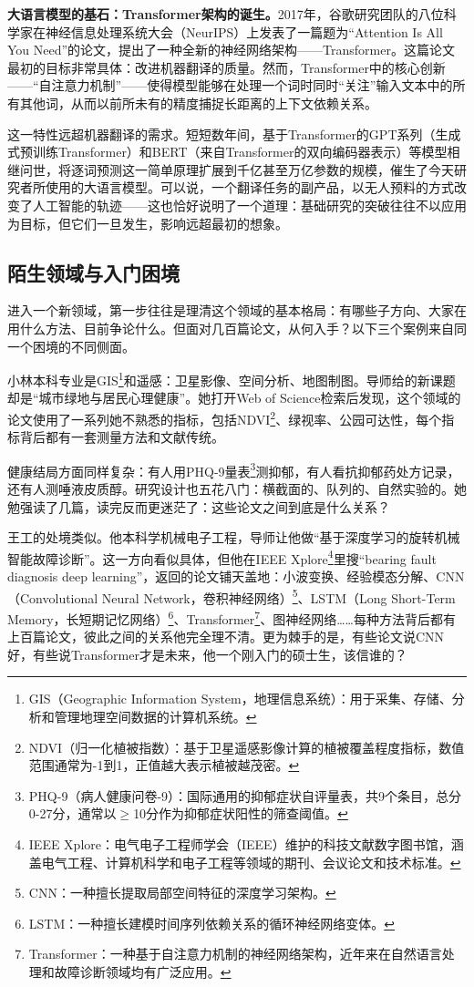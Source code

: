 \begin{funbox}
\textbf{大语言模型的基石：Transformer架构的诞生。}2017年，谷歌研究团队的八位科学家在神经信息处理系统大会（NeurIPS）上发表了一篇题为``Attention Is All You Need''的论文，提出了一种全新的神经网络架构——Transformer。这篇论文最初的目标非常具体：改进机器翻译的质量。然而，Transformer中的核心创新——``自注意力机制''——使得模型能够在处理一个词时同时``关注''输入文本中的所有其他词，从而以前所未有的精度捕捉长距离的上下文依赖关系。

这一特性远超机器翻译的需求。短短数年间，基于Transformer的GPT系列（生成式预训练Transformer）和BERT（来自Transformer的双向编码器表示）等模型相继问世，将逐词预测这一简单原理扩展到千亿甚至万亿参数的规模，催生了今天研究者所使用的大语言模型。可以说，一个翻译任务的副产品，以无人预料的方式改变了人工智能的轨迹——这也恰好说明了一个道理：基础研究的突破往往不以应用为目标，但它们一旦发生，影响远超最初的想象。
\end{funbox}

\subsection{陌生领域与入门困境}

进入一个新领域，第一步往往是理清这个领域的基本格局：有哪些子方向、大家在用什么方法、目前争论什么。但面对几百篇论文，从何入手？以下三个案例来自同一个困境的不同侧面。

小林本科专业是GIS\footnote{GIS（Geographic Information System，地理信息系统）：用于采集、存储、分析和管理地理空间数据的计算机系统。}和遥感：卫星影像、空间分析、地图制图。导师给的新课题却是``城市绿地与居民心理健康''。她打开Web of Science检索后发现，这个领域的论文使用了一系列她不熟悉的指标，包括NDVI\footnote{NDVI（归一化植被指数）：基于卫星遥感影像计算的植被覆盖程度指标，数值范围通常为-1到1，正值越大表示植被越茂密。}、绿视率、公园可达性，每个指标背后都有一套测量方法和文献传统。

健康结局方面同样复杂：有人用PHQ-9量表\footnote{PHQ-9（病人健康问卷-9）：国际通用的抑郁症状自评量表，共9个条目，总分0-27分，通常以$\geq$10分作为抑郁症状阳性的筛查阈值。}测抑郁，有人看抗抑郁药处方记录，还有人测唾液皮质醇。研究设计也五花八门：横截面的、队列的、自然实验的。她勉强读了几篇，读完反而更迷茫了：这些论文之间到底是什么关系？

王工的处境类似。他本科学机械电子工程，导师让他做``基于深度学习的旋转机械智能故障诊断''。这一方向看似具体，但他在IEEE Xplore\footnote{IEEE Xplore：电气电子工程师学会（IEEE）维护的科技文献数字图书馆，涵盖电气工程、计算机科学和电子工程等领域的期刊、会议论文和技术标准。}里搜``bearing fault diagnosis deep learning''，返回的论文铺天盖地：小波变换、经验模态分解、CNN（Convolutional Neural Network，卷积神经网络）\footnote{CNN：一种擅长提取局部空间特征的深度学习架构。}、LSTM（Long Short-Term Memory，长短期记忆网络）\footnote{LSTM：一种擅长建模时间序列依赖关系的循环神经网络变体。}、Transformer\footnote{Transformer：一种基于自注意力机制的神经网络架构，近年来在自然语言处理和故障诊断领域均有广泛应用。}、图神经网络……每种方法背后都有上百篇论文，彼此之间的关系他完全理不清。更为棘手的是，有些论文说CNN好，有些说Transformer才是未来，他一个刚入门的硕士生，该信谁的？


